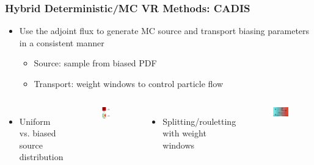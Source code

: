 \documentclass{beamer}
\begin{document}
\begin{frame}
\frametitle{Hybrid Deterministic/MC VR Methods: CADIS}
  \begin{itemize}
  \item{Use the adjoint flux to generate MC source and transport biasing parameters in a consistent manner}
    \begin{itemize}
    \item{Source: sample from biased PDF}
    \item{Transport: weight windows to control particle flow}
    \end{itemize}
  \end{itemize}
	\begin{columns}
		\begin{itemize}
			\item{Uniform vs. biased source distribution}
		\end{itemize}
                \begin{figure}
		\centering
		\includegraphics[scale=0.32]{bsrc_ex.jpg}
		\end{figure}
		\begin{itemize}
			\item{Splitting/rouletting with weight windows}
		\end{itemize}
                \begin{figure}
		\centering
		\includegraphics[scale=0.51]{ww_ex2.png}
		\end{figure}
	\end{columns}
\end{frame}
\end{document}

